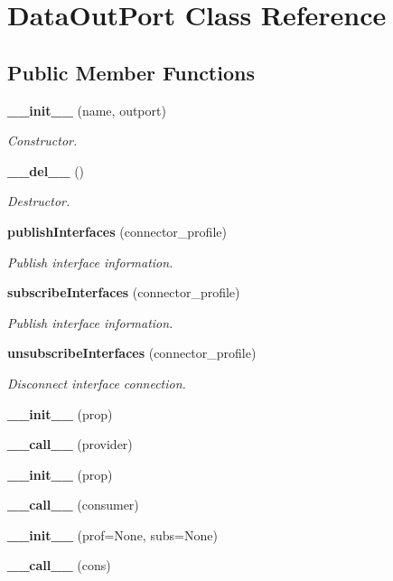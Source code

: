 \section{Data\-Out\-Port Class Reference}
\label{classDataOutPort}
\subsection*{Public Member Functions}
\begin{CompactItemize}
\item 
{\bf \_\-\_\-init\_\-\_\-} (name, outport)
\begin{CompactList}\small\item\em Constructor. \item\end{CompactList}\item 
{\bf \_\-\_\-del\_\-\_\-} ()
\begin{CompactList}\small\item\em Destructor. \item\end{CompactList}\item 
{\bf publish\-Interfaces} (connector\_\-profile)
\begin{CompactList}\small\item\em Publish interface information. \item\end{CompactList}\item 
{\bf subscribe\-Interfaces} (connector\_\-profile)
\begin{CompactList}\small\item\em Publish interface information. \item\end{CompactList}\item 
{\bf unsubscribe\-Interfaces} (connector\_\-profile)
\begin{CompactList}\small\item\em Disconnect interface connection. \item\end{CompactList}\item 
{\bf \_\-\_\-init\_\-\_\-} (prop)
\item 
{\bf \_\-\_\-call\_\-\_\-} (provider)
\item 
{\bf \_\-\_\-init\_\-\_\-} (prop)
\item 
{\bf \_\-\_\-call\_\-\_\-} (consumer)
\item 
{\bf \_\-\_\-init\_\-\_\-} (prof=None, subs=None)
\item 
{\bf \_\-\_\-call\_\-\_\-} (cons)
\end{CompactItemize}


